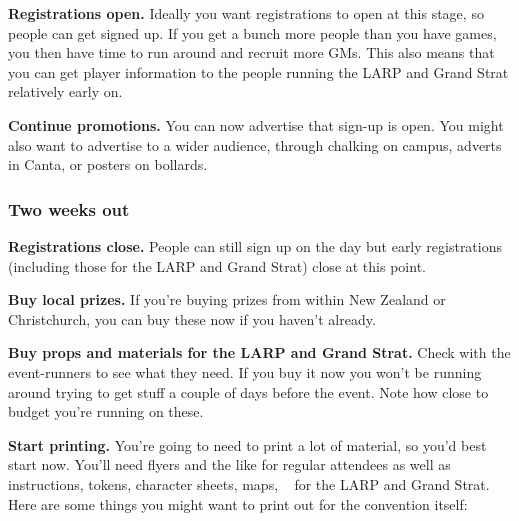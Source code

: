 \textbf{Registrations open.} Ideally you want registrations to open at this stage, so people can get signed up. If you get a bunch more people than you have games, you then have time to run around and recruit more GMs. This also means that you can get player information to the people running the LARP and Grand Strat relatively early on.

\textbf{Continue promotions.} You can now advertise that sign-up is open. You might also want to advertise to a wider audience, \eg through chalking on campus, adverts in Canta, or posters on bollards.

\subsubsection{Two weeks out}

\textbf{Registrations close.} People can still sign up on the day but early registrations (including those for the LARP and Grand Strat) close at this point.

\textbf{Buy local prizes.} If you're buying prizes from within New Zealand or Christchurch, you can buy these now if you haven't already.

\textbf{Buy props and materials for the LARP and Grand Strat.} Check with the event-runners to see what they need. If you buy it now you won't be running around trying to get stuff a couple of days before the event. Note how close to budget you're running on these.

\textbf{Start printing.} You're going to need to print a lot of material, so you'd best start now. You'll need flyers and the like for regular attendees as well as instructions, tokens, character sheets, maps, \etc~ for the LARP and Grand Strat. Here are some things you might want to print out for the convention itself:

